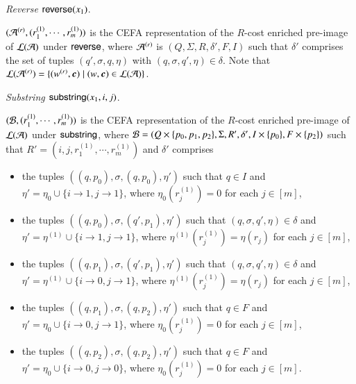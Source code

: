 \smallskip 

\noindent \emph{Reverse $\mathsf{reverse}(x_1)$}. 

$(\mathcal{A}^{(r)}, (r^{(1)}_1, \cdots, r^{(1)}_m))$ is the CEFA representation of the $R$-cost enriched pre-image of $\mathcal{L}(\mathcal{A})$ under $\mathsf{reverse}$, where $\mathcal{A}^{(r)}$ is $(Q, \Sigma, R, \delta', F, I)$ such that $\delta'$ comprises the set of tuples $(q', \sigma, q, \eta)$ with  $(q, \sigma, q', \eta) \in \delta$. Note that $\Lang(\Aut^{(r)}) = \{(w^{(r)}, \vec{c}) \mid (w, \vec{c}) \in \Lang(\Aut)\}$.


\smallskip

\noindent \emph{Substring $\mathsf{substring}(x_1, i, j)$}.


$(\mathcal{B}, (r^{(1)}_1, \cdots, r^{(1)}_m))$ is the CEFA representation of the $R$-cost enriched pre-image of $\mathcal{L}(\mathcal{A})$ under $\mathsf{substring}$, where $\mathcal{B} = (Q \times \{p_0, p_1, p_2\}, \Sigma, R', \delta', I \times \{p_0\}, F \times \{p_2\})$ such that $R' = (i, j, r^{(1)}_1,\cdots, r^{(1)}_m)$ and $\delta'$ comprises 
\begin{itemize}
\item the tuples $((q, p_0), \sigma, (q, p_0), \eta')$ such that $q \in I$ and $\eta' = \eta_0 \cup \{i \rightarrow 1, j \rightarrow 1\}$, where $\eta_0(r^{(1)}_j)=0$ for each $j \in [m]$,
%
\item the tuples $((q, p_0), \sigma, (q', p_1), \eta')$ such that $(q, \sigma, q', \eta) \in \delta$ and $\eta' = \eta^{(1)} \cup \{i \rightarrow 1, j  \rightarrow 1\}$, where $\eta^{(1)}(r^{(1)}_j)=\eta(r_j)$ for each $j \in [m]$,
%
\item the tuples $((q, p_1), \sigma, (q', p_1), \eta')$ such that $(q, \sigma, q', \eta) \in \delta$ and $\eta' = \eta^{(1)} \cup \{i \rightarrow 0, j  \rightarrow 1\}$, where $\eta^{(1)}(r^{(1)}_j)=\eta(r_j)$ for each $j \in [m]$,
%
\item the tuples $((q, p_1), \sigma, (q, p_2), \eta')$ such that $q \in F$ and $\eta' = \eta_0 \cup \{i \rightarrow 0, j  \rightarrow 1\}$, where $\eta_0(r^{(1)}_j)=0$ for each $j \in [m]$,
%
\item the tuples $((q, p_2), \sigma, (q, p_2), \eta')$ such that $q \in F$ and $\eta' = \eta_0 \cup \{i \rightarrow 0, j  \rightarrow 0\}$, where $\eta_0(r^{(1)}_j)=0$ for each $j \in [m]$.
%
\end{itemize}
%

